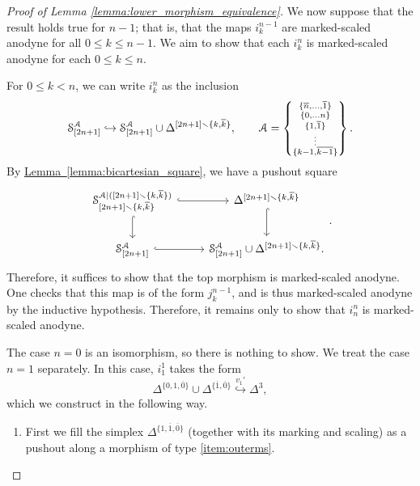 \documentclass[main.tex]{subfiles}
\begin{document}
\begin{proof}[Proof of Lemma \ref{lemma:lower_morphism_equivalence}]
  We now suppose that the result holds true for $n-1$; that is, that the maps $i^{n-1}_{k}$ are marked-scaled anodyne for all $0 \leq k \leq n-1$. We aim to show that each $i^{n}_{k}$ is marked-scaled anodyne for each $0 \leq k \leq n$.

  For $0 \leq k < n$, we can write $i^{n}_{k}$ as the inclusion
  \begin{equation*}
    \S^{\mathcal{A}}_{[2n+1]} \hookrightarrow \S^{\mathcal{A}}_{[2n+1]} \cup \Delta^{[2n+1] \smallsetminus \{k, \overline{k}\}},\qquad \mathcal{A}
    = \left\{ \substack{ \{\overline{n}, \ldots, \overline{1}\} \\ \{0, \ldots n\} \\ \{1, \overline{1}\} \\ \vdots \\ \{k-1, \overline{k-1}\} } \right\}.
  \end{equation*}
  By \hyperref[lemma:bicartesian_square]{Lemma~\ref*{lemma:bicartesian_square}}, we have a pushout square
  \begin{equation*}
    \begin{tikzcd}
      \S^{\mathcal{A}|([2n+1] \smallsetminus \{k, \overline{k}\})}_{[2n+1] \smallsetminus \{k, \overline{k}\}}
      \arrow[r, hook]
      \arrow[d, hook]
      & \Delta^{[2n+1] \smallsetminus \{k, \overline{k}\}}
      \arrow[d, hook]
      \\
      \S^{\mathcal{A}}_{[2n+1]}
      \arrow[r, hook]
      & \S^{\mathcal{A}}_{[2n+1]} \cup \Delta^{[2n+1] \smallsetminus \{k, \overline{k}\}}.
    \end{tikzcd}.
  \end{equation*}
  Therefore, it suffices to show that the top morphism is marked-scaled anodyne. One checks that this map is of the form $j^{n-1}_{k}$, and is thus marked-scaled anodyne by the inductive hypothesis. Therefore, it remains only to show that $i^{n}_{n}$ is marked-scaled anodyne.

  The case $n = 0$ is an isomorphism, so there is nothing to show. We treat the case $n = 1$ separately. In this case, $i^{1}_{1}$ takes the form
  \begin{equation*}
    \Delta^{\{0,1,\overline{0}\}} \cup \Delta^{\{\overline{1},\overline{0}\}} \overset{v_{1}'}{\hookrightarrow} \Delta^{3},
  \end{equation*}
  which we construct in the following way.
  \begin{enumerate}
    \item First we fill the simplex $\Delta^{\{1,\overline{1},\overline{0}\}}$ (together with its marking and scaling) as a pushout along a morphism of type \ref{item:outerms}.


\end{enumerate}
\end{proof}
\end{document}
